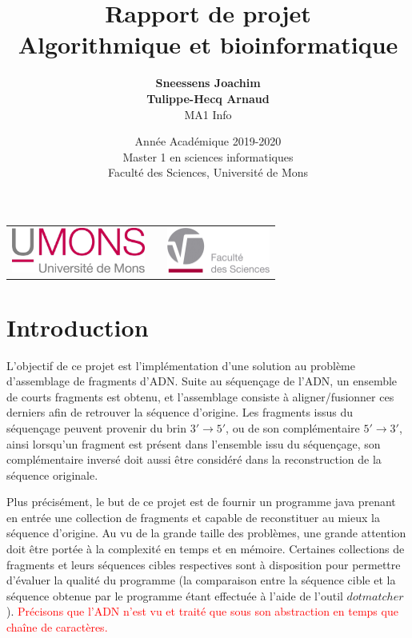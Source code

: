 \documentclass{article}
\title{
{\Huge \textbf{Rapport de projet}\\
Algorithmique et bioinformatique}}
\author{\textbf{Sneessens Joachim}\\\textbf{Tulippe-Hecq Arnaud}\\MA1 Info}
\date{Année Académique 2019-2020\\
Master 1 en sciences informatiques\\
\vspace{1cm}
Faculté des Sciences, Université de Mons}
\begin{document}
\maketitle

\vspace{9cm}

\begin{center}
\begin{tabular}[t]{c c c}
\includegraphics[height=1.5cm]{logoumons.jpg} &
\hspace{1cm} &
\includegraphics[height=1.5cm]{logofs.jpg}
\end{tabular}
\end{center}



\newpage

\section{Introduction}


L'objectif de ce projet est l'implémentation d'une solution au problème d'assemblage de fragments d'ADN. Suite au séquençage de l'ADN, un ensemble de courts fragments est obtenu, et l'assemblage consiste à aligner/fusionner ces derniers afin de retrouver la séquence d'origine. Les fragments issus du séquençage peuvent provenir du brin $3' \to 5'$, ou de son complémentaire $5' \to 3'$, ainsi lorsqu'un fragment est présent dans l'ensemble issu du séquençage, son complémentaire inversé doit aussi être considéré dans la reconstruction de la séquence originale.

Plus précisément, le but de ce projet est de fournir un programme java prenant en entrée une collection de fragments et capable de reconstituer au mieux la séquence d'origine. Au vu de la grande taille des problèmes, une grande attention doit être portée à la complexité en temps et en mémoire. Certaines collections de fragments et leurs séquences cibles respectives sont à disposition pour permettre d'évaluer la qualité du programme (la comparaison entre la séquence cible et la séquence obtenue par le 
programme étant effectuée à l'aide de l'outil $dotmatcher$).
\textcolor{red}{Précisons que l'ADN n'est vu et traité que sous son abstraction en temps que chaîne de caractères.}
\end{document}
